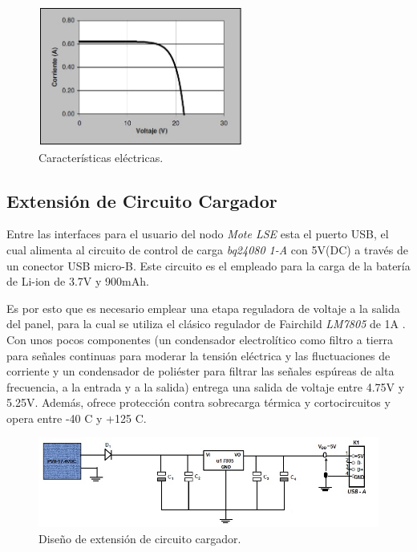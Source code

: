 {%

\vspace{30px}
\begin{figure}[h!]
	\centering
    \includegraphics[width=0.6\textwidth]{./Figures/curva.JPG}
    	\caption{Características eléctricas.}
	\label{fig:curva}
\end{figure}

\clearpage
\subsection{Extensión de Circuito Cargador}
\label{subsec:extensión}
Entre las interfaces para el usuario del nodo \textit{Mote LSE} esta el puerto USB, el cual alimenta al circuito de control de carga \textit{bq24080 1-A} con 5V(DC) a través de un conector USB micro-B. Este circuito es el empleado para la carga de la batería de Li-ion de 3.7V y 900mAh.

Es por esto que es necesario emplear una etapa reguladora de voltaje a la salida del panel, para la cual se utiliza el clásico regulador de Fairchild \textit{LM7805} de 1A \citep{7805}. Con unos pocos componentes (un condensador electrolítico como filtro a tierra para señales continuas para moderar la tensión eléctrica y las fluctuaciones de corriente y un condensador de poliéster para filtrar las señales espúreas de alta frecuencia, a la entrada y a la salida) entrega una salida de voltaje entre 4.75V y 5.25V. Además, ofrece protección contra sobrecarga térmica y cortocircuitos y opera entre -40 \grados C y +125 \grados C.

\vspace{30px}
\begin{figure}[h!]
	\centering
    \includegraphics[width=1\textwidth]{./Figures/circuito.jpg}
    	\caption{Diseño de extensión de circuito cargador.}
	\label{fig:circuito}
\end{figure}

}
